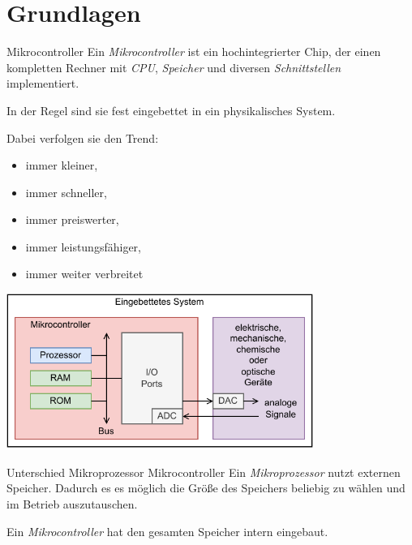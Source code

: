 \section{Grundlagen}

\begin{defi}{Mikrocontroller}
    Ein \emph{Mikrocontroller} ist ein hochintegrierter Chip, der einen kompletten Rechner mit \emph{CPU}, \emph{Speicher} und diversen \emph{Schnittstellen} implementiert.

    In der Regel sind sie fest eingebettet in ein physikalisches System.

    Dabei verfolgen sie den Trend:
    \begin{itemize}
        \item immer kleiner,
        \item immer schneller,
        \item immer preiswerter,
        \item immer leistungsfähiger,
        \item immer weiter verbreitet
    \end{itemize}

    \vspace{1em}

    \begin{center}
        \includegraphics[width=0.75\textwidth]{includes/figures/defi_microcontroller.pdf}
    \end{center}
\end{defi}

\begin{bonus}{Unterschied Mikroprozessor Mikrocontroller}
    Ein \emph{Mikroprozessor} nutzt externen Speicher.
    Dadurch es es möglich die Größe des Speichers beliebig zu wählen und im Betrieb auszutauschen.

    Ein \emph{Mikrocontroller} hat den gesamten Speicher intern eingebaut.
\end{bonus}


